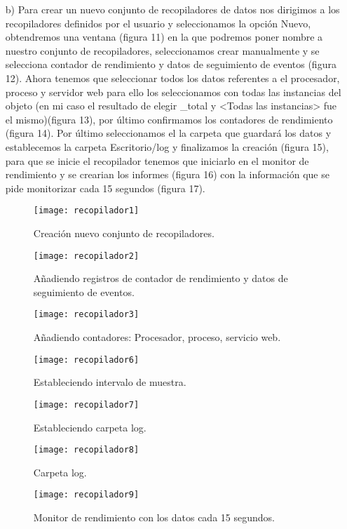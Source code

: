 \documentclass[a4paper, 10pt]{article} %
\begin{document}
\begin{itemize}
 \item[b)] Para crear un nuevo conjunto de recopiladores de datos nos dirigimos a los recopiladores definidos por el usuario y seleccionamos la opción Nuevo, obtendremos una ventana (figura 11) en la que podremos poner nombre a nuestro conjunto de recopiladores, seleccionamos crear manualmente y se selecciona contador de rendimiento y datos de seguimiento de eventos (figura 12). Ahora tenemos que seleccionar todos los datos referentes a el procesador, proceso y servidor web para ello los seleccionamos con todas las instancias del objeto (en mi caso el resultado de elegir \_total y <Todas las instancias> fue el mismo)(figura 13), por último confirmamos los contadores de rendimiento (figura 14). Por último seleccionamos el la carpeta que guardará los datos y establecemos la carpeta Escritorio/log y finalizamos la creación (figura 15), para que se inicie el recopilador tenemos que iniciarlo en el monitor de rendimiento y se crearian los informes (figura 16) con la información que se pide monitorizar cada 15 segundos (figura 17).
  \begin{figure}[H]
\centering 
\texttt{[image: recopilador1]} 
\caption{Creación nuevo conjunto de recopiladores.} 
\label{contexto:figura} 
\end{figure}
\begin{figure}[H]
\centering 
\texttt{[image: recopilador2]} 
\caption{Añadiendo registros de contador de rendimiento y datos de seguimiento de eventos.} 
\label{contexto:figura} 
\end{figure}
 \begin{figure}[H]
\centering 
\texttt{[image: recopilador3]} 
\caption{Añadiendo contadores: Procesador, proceso, servicio web.} 
\label{contexto:figura} 
\end{figure}
\begin{figure}[H]
\centering 
\texttt{[image: recopilador6]} 
\caption{Estableciendo intervalo de muestra.} 
\label{contexto:figura} 
\end{figure}
 \begin{figure}[H]
\centering 
\texttt{[image: recopilador7]} 
\caption{Estableciendo carpeta log.} 
\label{contexto:figura} 
\end{figure}
\begin{figure}[H]
\centering 
\texttt{[image: recopilador8]} 
\caption{Carpeta log.} 
\label{contexto:figura} 
\end{figure}
\begin{figure}[H]
\centering 
\texttt{[image: recopilador9]} 
\caption{Monitor de rendimiento con los datos cada 15 segundos.} 
\label{contexto:figura} 
\end{figure}
 \end{itemize}
\end{document}
